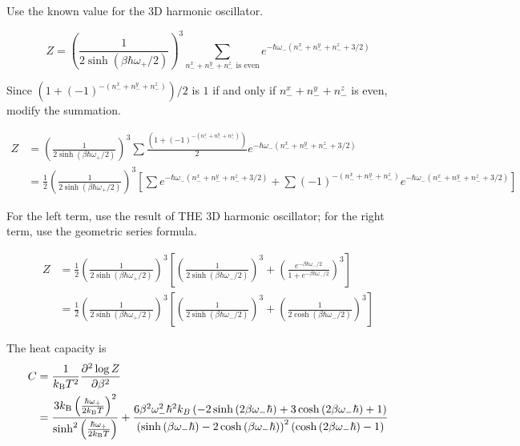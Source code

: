 \documentclass[a4paper,11pt]{article}
\begin{document}
Use the known value for the 3D harmonic oscillator.

\begin{equation}
    Z = \left(\frac{1}{2\sinh(\beta\hbar\omega_+/2)}\right)^3\sum_{\text{$n_-^x+n_-^y+n_-^z$ is even}} e^{-\hbar\omega_-(n_-^x + n_-^y + n_-^z + 3/2)}
\end{equation}

Since $(1 + (-1)^{-(n_-^x + n_-^y + n_-^z)}) / 2$ is $1$ if and only if $n_-^x + n_-^y + n_-^z$ is even, modify the summation.

\begin{align}
    Z &= \left(\frac{1}{2\sinh(\beta\hbar\omega_+/2)}\right)^3\sum \frac{(1 + (-1)^{-(n_-^x + n_-^y + n_-^z)})}{2}e^{-\hbar\omega_-(n_-^x + n_-^y + n_-^z + 3/2)}\\
    &= \frac{1}{2}\left(\frac{1}{2\sinh(\beta\hbar\omega_+/2)}\right)^3\left[\sum e^{-\hbar\omega_-(n_-^x + n_-^y + n_-^z + 3/2)}+ \sum (-1)^{-(n_-^x + n_-^y + n_-^z)}e^{-\hbar\omega_-(n_-^x + n_-^y + n_-^z + 3/2)}\right]
\end{align}

For the left term, use the result of THE 3D harmonic oscillator; for the right term, use the geometric series formula.

\begin{align}
    Z&= \frac{1}{2}\left(\frac{1}{2\sinh(\beta\hbar\omega_+/2)}\right)^3\left[\left(\frac{1}{2\sinh(\beta\hbar\omega_-/2)}\right)^3 +\left(\frac{e^{-\beta\hbar\omega_-/2}}{1+e^{-\beta\hbar\omega_-/2}}\right)^3\right] \\
    &= \frac{1}{2}\left(\frac{1}{2\sinh(\beta\hbar\omega_+/2)}\right)^3\left[\left(\frac{1}{2\sinh(\beta\hbar\omega_-/2)}\right)^3 +\left(\frac{1}{2\cosh(\beta\hbar\omega_-/2)}\right)^3\right]
\end{align}

The heat capacity is
\begin{align}
    C 
    &= \frac{1}{k_{\mathrm{B}} T^2}\frac{\partial^2\log Z}{\partial \beta^2} \\
    &= \frac{3k_{\mathrm{B}}\left(\frac{\hbar \omega_+}{2k_{\mathrm{B}} T}\right)^2}{\sinh^2\left(\frac{\hbar\omega_+}{2k_{\mathrm{B}} T}\right)} + \frac{6 \beta^{2} \omega_{-}^{2} \hbar^{2} k_{B} \left(- 2 \sinh{\left(2 \beta \omega_{-} \hbar \right)} + 3 \cosh{\left(2 \beta \omega_{-} \hbar \right)} + 1\right)}{\left(\sinh{\left(\beta \omega_{-} \hbar \right)} - 2 \cosh{\left(\beta \omega_{-} \hbar \right)}\right)^{2} \left(\cosh{\left(2 \beta \omega_{-} \hbar \right)} - 1\right)}
\end{align}
    
\end{document}
